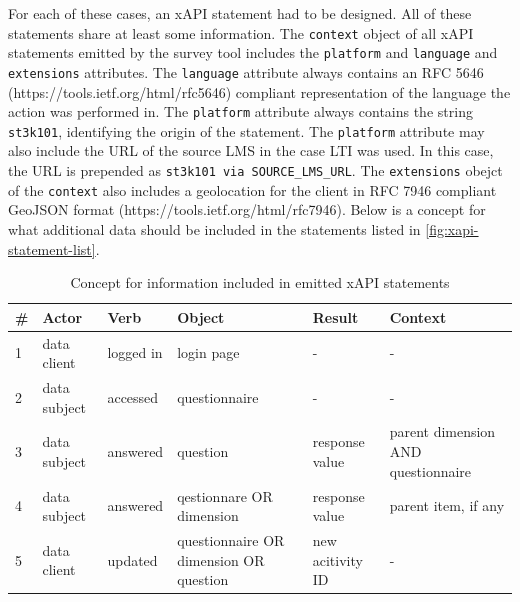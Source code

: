 \documentclass[a4paper,11pt]{article}
\def\inline{\lstinline[basicstyle=\ttfamily,keywordstyle={}]}
\begin{document}
                For each of these cases, an xAPI statement had to be designed.
                All of these statements share at least some information.
                The \inline{context} object of all xAPI statements emitted by the survey
                tool includes the \inline{platform} and \inline{language} and 
                \inline{extensions} attributes. The \inline{language} attribute always
                contains an RFC 5646 (https://tools.ietf.org/html/rfc5646)
                compliant representation of the language the action was performed
                in. The \inline{platform} attribute always contains the
                string \inline{st3k101}, identifying the origin of the statement.
                The \inline{platform} attribute may also include the URL
                of the source LMS in the case LTI was used. In this case,
                the URL is prepended as \inline{st3k101 via SOURCE_LMS_URL}.
                The \inline{extensions} obejct of the \inline{context} also
                includes a geolocation for the client in RFC 7946 compliant GeoJSON
                format (https://tools.ietf.org/html/rfc7946).
                Below is a concept for what additional data should be included in 
                the statements listed in \ref{fig:xapi-statement-list}.

                \begin{table}[h]
                    \begin{tabularx}{\textwidth}{|l|l|l|X|X|X|}
                        \hline
                        \# & Actor & Verb & Object & Result & Context \\ 
                        \hline \hline
                        1 & data client & logged in & login page & - & - \\ 
                        2 & data subject & accessed & questionnaire & - & - \\ 
                        3 & data subject & answered & question & response value & parent dimension AND questionnaire  \\ 
                        4 & data subject & answered & qestionnare OR dimension & response value & parent item, if any \\ 
                        5 & data client & updated & questionnaire OR dimension OR question & new acitivity ID & - \\ 
                        \hline
                    \end{tabularx}
                    \caption{Concept for information included in emitted xAPI statements}
                    \label{table:xapi-data-concept}
                \end{table}
\end{document}

